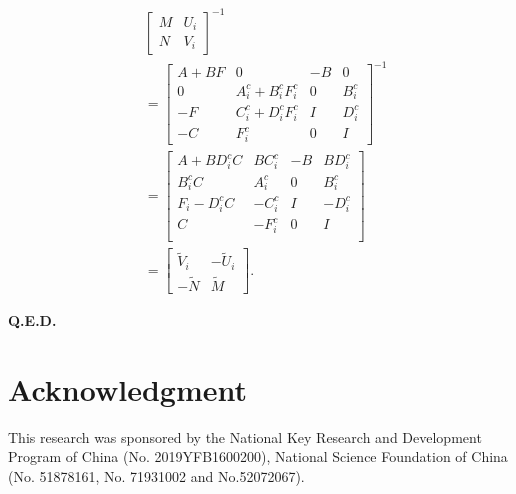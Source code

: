 \documentclass[a4paper,fleqn]{cas-sc}
\begin{document}
\begin{equation}
  \begin{aligned}
     & \left[\begin{array}{cc}
        M & U_{i} \\
        N & V_{i}
      \end{array}\right]^{-1}  \\
     & =\left[\begin{array}{cc|cc}
        A+B F     & 0                             & -B & 0         \\
        0         & A_{i}^{c}+B_{i}^{c} F_{i}^{c} & 0  & B_{i}^{c} \\
        \hline -F & C_{i}^{c}+D_{i}^{c} F_{i}^{c} & I  & D_{i}^{c} \\
        -C        & F_{i}^{c}                     & 0  & I
      \end{array}\right]^{-1} \\
     & =\left[\begin{array}{cc|cc}
        A+B  D_{i}^{c} C          & B  C_{i}^{c} & -B & B  D_{i}^{c} \\
        B_{i}^{c} C               & A_{i}^{c}    & 0  & B_{i}^{c}    \\
        \hline F_{i}- D_{i}^{c} C & -C_{i}^{c}   & I  & -D_{i}^{c}   \\
        C                         & -F_{i}^{c}   & 0  & I            \\
      \end{array}\right]      \\
     & =\left[\begin{array}{cc}
        \tilde{V}_{i} & -\tilde{U}_{i} \\
        -\tilde{N}    & \tilde{M}
      \end{array}\right].
  \end{aligned}
\end{equation}

\textbf{Q.E.D.}


\printcredits

\section*{Acknowledgment}

This research was sponsored by the National Key Research and Development Program of China (No. 2019YFB1600200), National Science Foundation of China (No. 51878161, No. 71931002 and No.52072067).

% 





\end{document}
